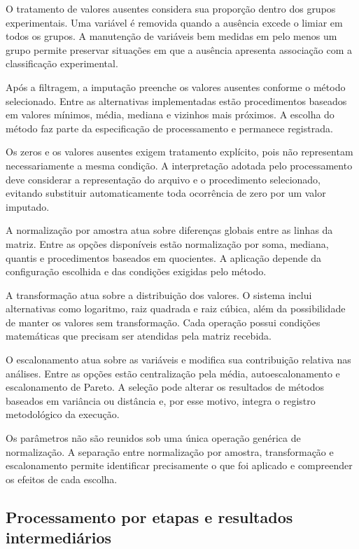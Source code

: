 O tratamento de valores ausentes considera sua proporção dentro dos grupos experimentais. Uma variável é removida quando a ausência excede o limiar em todos os grupos. A manutenção de variáveis bem medidas em pelo menos um grupo permite preservar situações em que a ausência apresenta associação com a classificação experimental.

Após a filtragem, a imputação preenche os valores ausentes conforme o método selecionado. Entre as alternativas implementadas estão procedimentos baseados em valores mínimos, média, mediana e vizinhos mais próximos. A escolha do método faz parte da especificação de processamento e permanece registrada.

Os zeros e os valores ausentes exigem tratamento explícito, pois não representam necessariamente a mesma condição. A interpretação adotada pelo processamento deve considerar a representação do arquivo e o procedimento selecionado, evitando substituir automaticamente toda ocorrência de zero por um valor imputado.

A normalização por amostra atua sobre diferenças globais entre as linhas da matriz. Entre as opções disponíveis estão normalização por soma, mediana, quantis e procedimentos baseados em quocientes. A aplicação depende da configuração escolhida e das condições exigidas pelo método.

A transformação atua sobre a distribuição dos valores. O sistema inclui alternativas como logaritmo, raiz quadrada e raiz cúbica, além da possibilidade de manter os valores sem transformação. Cada operação possui condições matemáticas que precisam ser atendidas pela matriz recebida.

O escalonamento atua sobre as variáveis e modifica sua contribuição relativa nas análises. Entre as opções estão centralização pela média, autoescalonamento e escalonamento de Pareto. A seleção pode alterar os resultados de métodos baseados em variância ou distância e, por esse motivo, integra o registro metodológico da execução.

Os parâmetros não são reunidos sob uma única operação genérica de normalização. A separação entre normalização por amostra, transformação e escalonamento permite identificar precisamente o que foi aplicado e compreender os efeitos de cada escolha.

\subsection{Processamento por etapas e resultados intermediários}
\label{subsec:processamento-etapas}

